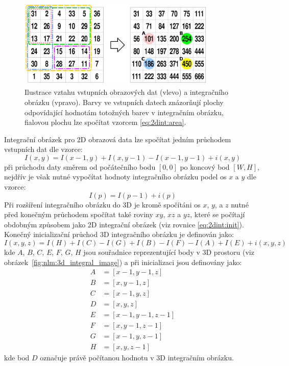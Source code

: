\begin{figure} [H]
    \centering
    \label{fig:nlm:2d_integal_image}
    \includegraphics[width=0.85\textwidth]{figures/2d_integral_image.png}
    \caption{Ilustrace vztahu vstupních obrazových dat (vlevo) a integračního obrázku (vpravo). Barvy ve vstupních datech znázorňují plochy odpovídající hodnotám totožných barev v integračním obrázku, fialovou plochu lze spočítat vzorcem \ref{eq:2dint:area}. }
\end{figure}

Integrační obrázek pro 2D obrazová data lze spočítat jedním průchodem vstupních dat dle vzorce:
\begin{equation}
    \label{eq:2dint:init}
    I(x, y) = I(x - 1, y) + I(x, y - 1) - I(x - 1, y - 1) + i(x, y)
\end{equation}
při průchodu daty směrem od počátečního bodu $[0,0]$ po koncový bod $[W, H]$, nejdřív je však nutné vypočítat hodnoty integračního obrázku podel os $x$ a $y$ dle vzorce:
$$I(p)=I(p-1)+i(p)$$
Při rozšíření integračního obrázku do 3D je kromě spočítáni os $x$, $y$, a $z$ nutné před konečným průchodem spočítat také roviny $xy$, $xz$ a $yz$, které se počítají obdobným způsobem jako 2D integrační obrázek (viz rovnice \ref{eq:2dint:init}). Konečný inicializační průchod 3D integračního obrázku je definován jako:
\begin{equation}
    I(x, y, z) = I(H) + I(C) - I(G) + I(B) - I(F) - I(A) + I(E) + i(x, y, z)
\end{equation}
kde $A$, $B$, $C$, $E$, $F$, $G$, $H$ jsou souřadnice reprezentující body v 3D prostoru (viz obrázek~\ref{fig:nlm:3d_integral_image}) a při inicializaci jsou definovány jako:
\begin{align*}
    A &= [x - 1, y - 1, z] \\
    B &= [x, y - 1, z] \\
    C &= [x - 1, y, z] \\
    D &= [x, y, z] \\
    E &= [x - 1, y - 1, z - 1] \\
    F &= [x, y - 1, z - 1] \\
    G &= [x - 1, y, z - 1] \\
    H &= [x, y, z - 1]    
\end{align*}
kde bod $D$ označuje právě počítanou hodnotu v 3D integračním obrázku.

